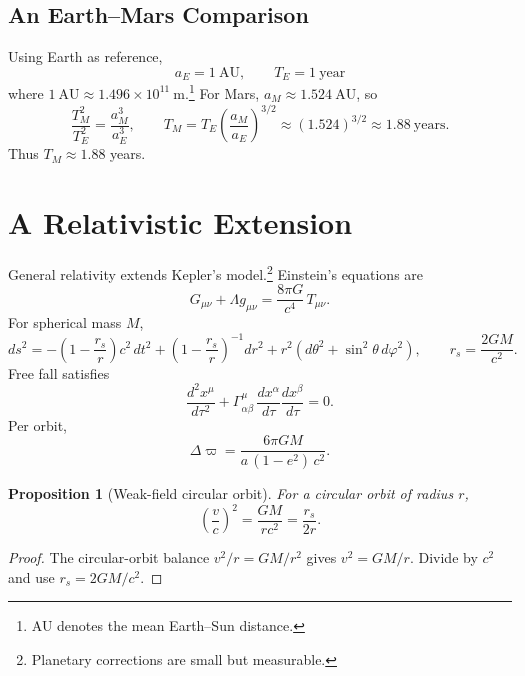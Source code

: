 \documentclass[10pt]{article}
\newtheorem{proposition}{Proposition}[section]  %
\begin{document}
\subsection{An Earth--Mars Comparison}
Using Earth as reference,
\[
  a_{E} = 1~\text{AU}, \qquad T_{E} = 1~\text{year}
\]
where $1~\text{AU} \approx 1.496 \times 10^{11}~\text{m}$.\footnote{AU
denotes the mean Earth--Sun distance.} For Mars, $a_{M} \approx
1.524~\text{AU}$, so
\[
  \frac{T_{M}^{2}}{T_{E}^{2}} = \frac{a_{M}^{3}}{a_{E}^{3}},
  \qquad
  T_{M} = T_{E}\left(\frac{a_{M}}{a_{E}}\right)^{3/2}
        \approx (1.524)^{3/2} \approx 1.88~\text{years}.
\]
Thus $T_{M} \approx 1.88$ years.

\section{A Relativistic Extension}
General relativity extends Kepler's model.\footnote{Planetary corrections
are small but measurable.} Einstein's equations are
\begin{equation}
  G_{\mu\nu} + \Lambda g_{\mu\nu} = \frac{8\pi G}{c^{4}}\, T_{\mu\nu}.
\end{equation}
For spherical mass $M$,
\begin{equation}
  ds^{2} = -\left(1 - \frac{r_{s}}{r}\right)c^{2}\,dt^{2}
           + \left(1 - \frac{r_{s}}{r}\right)^{-1} dr^{2}
           + r^{2}\left(d\theta^{2} + \sin^{2}\!\theta\, d\varphi^{2}\right),
  \qquad r_{s} = \frac{2GM}{c^{2}}.
\end{equation}
Free fall satisfies
\begin{equation}
  \frac{d^{2}x^{\mu}}{d\tau^{2}}
  + \Gamma^{\mu}_{\alpha\beta}\,
    \frac{dx^{\alpha}}{d\tau}\frac{dx^{\beta}}{d\tau} = 0 .
\end{equation}
Per orbit,
\begin{equation}
  \Delta\varpi = \frac{6\pi G M}{a\,(1 - e^{2})\,c^{2}} .
\end{equation}

\begin{proposition}[Weak-field circular orbit]\label{prop:weak}
For a circular orbit of radius $r$,
\begin{equation}
  \left(\frac{v}{c}\right)^{2} = \frac{GM}{r c^{2}} = \frac{r_{s}}{2r}.
  \tag{10}
\end{equation}
\end{proposition}

\begin{proof}
The circular-orbit balance $v^{2}/r = GM/r^{2}$ gives $v^{2} = GM/r$.
Divide by $c^{2}$ and use $r_{s} = 2GM/c^{2}$.
\end{proof}
\end{document}
